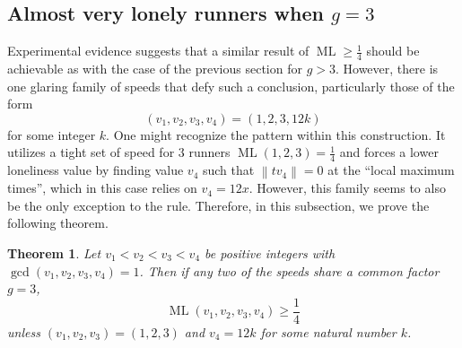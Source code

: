 \documentclass[11pt]{amsart}
\newtheorem{theorem}{Theorem}[section]
\newcommand{\Norm}[1]{\left\lVert #1 \right\rVert}
\DeclareMathOperator{\ML}{ML}
\begin{document}
\subsection{Almost very lonely runners when $g = 3$}
\label{sec44}
Experimental evidence suggests that a similar result of $\ML \geq \frac{1}{4}$ should be achievable as with the case of the previous section for $g > 3$. However, there is one glaring family of speeds that defy such a conclusion, particularly those of the form
$$(v_1,v_2,v_3,v_4) = (1,2,3,12k)$$
for some integer $k$. One might recognize the pattern within this construction. It utilizes a tight set of speed for $3$ runners $\ML(1,2,3) = \frac{1}{4}$ and forces a lower loneliness value by finding value $v_4$ such that $\Norm{tv_4} = 0$ at the ``local maximum times'', which in this case relies on $v_4 = 12x$. However, this family seems to also be the only exception to the rule. Therefore, in this subsection, we prove the following theorem.

\begin{theorem}
    \label{the4}
    Let $v_1 < v_2 < v_3 < v_4$ be positive integers with $\gcd(v_1,v_2,v_3,v_4) = 1$. Then if any two of the speeds share a common factor $g = 3$,
    $$\ML(v_1,v_2,v_3,v_4) \geq \frac{1}{4}$$
    unless $(v_1,v_2,v_3) = (1,2,3)$ and $v_4 = 12k$ for some natural number $k$.
\end{theorem}
\end{document}
